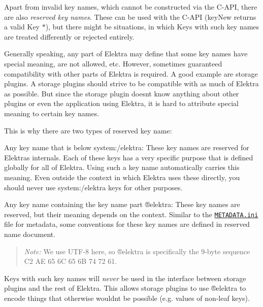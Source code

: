 Apart from invalid key names, which cannot be constructed via the C-\/\+A\+PI, there are also {\itshape reserved key names}. These can be used with the C-\/\+A\+PI ({\ttfamily key\+New} returns a valid {\ttfamily Key $\ast$}), but there might be situations, in which {\ttfamily Key}s with such key names are treated differently or rejected entirely.

Generally speaking, any part of Elektra may define that some key names have special meaning, are not allowed, etc. However, sometimes guaranteed compatibility with other parts of Elektra is required. A good example are storage plugins. A storage plugins should strive to be compatible with as much of Elektra as possible. But since the storage plugin doesn\textquotesingle{}t know anything about other plugins or even the application using Elektra, it is hard to attribute special meaning to certain key names.

This is why there are two types of reserved key name\+:


\begin{DoxyEnumerate}
\item Any key name that is below {\ttfamily system\+:/elektra}\+: These key names are reserved for Elektra\textquotesingle{}s internals. Each of these keys has a very specific purpose that is defined globally for all of Elektra. Using such a key name automatically carries this meaning. Even outside the context in which Elektra uses these directly, you should never use {\ttfamily system\+:/elektra} keys for other purposes.
\item Any key name containing the key name part {\ttfamily ®elektra}\+: These key names are reserved, but their meaning depends on the context. Similar to the \href{/home/jenkins/workspace/libelektra-release/doc/METADATA.ini}{\tt M\+E\+T\+A\+D\+A\+T\+A.\+ini} file for metadata, some conventions for these key names are defined in reserved name document.
\end{DoxyEnumerate}

\begin{quote}
{\itshape Note\+:} We use U\+T\+F-\/8 here, so {\ttfamily ®elektra} is specifically the 9-\/byte sequence {\ttfamily C2 AE 65 6C 65 6B 74 72 61}. \end{quote}


{\ttfamily Key}s with such key names will {\itshape never} be used in the interface between storage plugins and the rest of Elektra. This allows storage plugins to use {\ttfamily ®elektra} to encode things that otherwise wouldn\textquotesingle{}t be possible (e.\+g. values of non-\/leaf keys).





